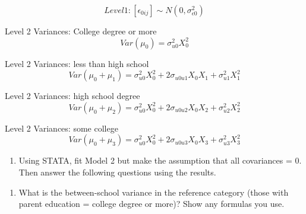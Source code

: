 \documentclass[]{article}
\newenvironment{Shaded}{\begin{snugshade}}{\end{snugshade}}
\newcommand{\CommentTok}[1]{\textcolor[rgb]{0.56,0.35,0.01}{\textit{#1}}}
\newcommand{\DataTypeTok}[1]{\textcolor[rgb]{0.13,0.29,0.53}{#1}}
\newcommand{\KeywordTok}[1]{\textcolor[rgb]{0.13,0.29,0.53}{\textbf{#1}}}
\newcommand{\NormalTok}[1]{#1}
\newcommand{\OperatorTok}[1]{\textcolor[rgb]{0.81,0.36,0.00}{\textbf{#1}}}
\newcommand{\OtherTok}[1]{\textcolor[rgb]{0.56,0.35,0.01}{#1}}
\newcommand{\StringTok}[1]{\textcolor[rgb]{0.31,0.60,0.02}{#1}}
\providecommand{\tightlist}{%
  \setlength{\itemsep}{0pt}\setlength{\parskip}{0pt}}
\begin{document}
\[ Level 1: [\epsilon_{0ij}] \sim N(0,\sigma^2_{\epsilon0}) \]

Level 2 Variances: College degree or more
\[  Var(\mu_0) = \sigma^2_{u0}X^2_0  \]

Level 2 Variances: less than high school
\[  Var(\mu_0 + \mu_1) = \sigma^2_{u0}X^2_0 + 2\sigma_{u0u1}X_0X_1 + \sigma^2_{u1}X^2_1 \]

Level 2 Variances: high school degree
\[  Var(\mu_0 + \mu_2) = \sigma^2_{u0}X^2_0 + 2\sigma_{u0u2}X_0X_2 + \sigma^2_{u2}X^2_2  \]

Level 2 Variances: some college
\[  Var(\mu_0 + \mu_3) = \sigma^2_{u0}X^2_0 + 2\sigma_{u0u3}X_0X_3 + \sigma^2_{u3}X^2_3  \]

\begin{enumerate}
\def\labelenumi{\arabic{enumi})}
\setcounter{enumi}{6}
\tightlist
\item
  Using STATA, fit Model 2 but make the assumption that all covariances
  = 0. Then answer the following questions using the results.
\end{enumerate}

\begin{enumerate}
\def\labelenumi{\alph{enumi}.}
\tightlist
\item
  What is the between-school variance in the reference category (those
  with parent education = college degree or more)? Show any formulas you
  use.
\end{enumerate}

\begin{Shaded}
\end{Shaded}
\end{document}
